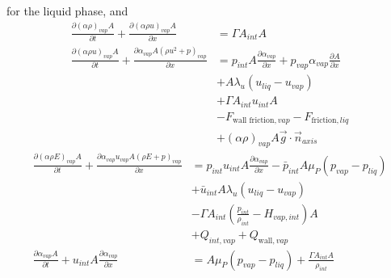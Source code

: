 for the liquid phase, and
\begin{align}
  \frac{\partial \left( \alpha \rho \right)_{vap} A}{\partial t}
  + \frac{\partial \left( \alpha \rho u \right)_{vap} A}{\partial x}
  &=  \Gamma A_{int} A
  \\
  \nonumber
  \frac{\partial \left( \alpha \rho u \right)_{vap} A}{\partial t}
  + \frac{\partial \alpha_{vap} A \left( \rho u^2 + p \right)_{vap} }{\partial x}
  &= p_{int} A \frac{\partial \alpha_{vap}}{\partial x} + p_{vap} \alpha_{vap} \frac{\partial A}{\partial x}
  \\
  \nonumber
  &+ A \lambda_u (u_{liq} - u_{vap})
  \\
  \nonumber
  &+ \Gamma A_{int} u_{int} A
  \\
  \nonumber
  &- F_{\text{wall friction}, vap} - F_{\text{friction}, liq}
  \\
  &+ \left( \alpha \rho \right)_{vap} A \vec{g} \cdot \vec{n}_{axis}
\end{align}
\begin{align}
  \nonumber
  \frac{\partial \left( \alpha \rho E \right)_{vap} A}{\partial t}
  + \frac{\partial \alpha_{vap} u_{vap} A \left( \rho E + p \right)_{vap}}{\partial x}
  &= p_{int} u_{int} A \frac{\partial \alpha_{vap}}{\partial x} - \bar{p}_{int} A \mu_P (p_{vap} - p_{liq})
  \\
  \nonumber
  &+ \bar{u}_{int} A \lambda_u (u_{liq} - u_{vap})
  \\
  \nonumber
  &- \Gamma A_{int} \left( \frac{p_{int}}{\rho_{int}} - H_{vap, int} \right) A
  \\
  &+ Q_{int, vap} + Q_{\text{wall}, vap}
  \\
  \label{E-R:81}
  \frac{\partial \alpha_{vap} A}{\partial t} + u_{int} A \frac{\partial \alpha_{vap}}{\partial x}
  &= A \mu_P (p_{vap} - p_{liq}) + \frac{\Gamma A_{int} A}{\rho_{int}}
\end{align}
%
%
